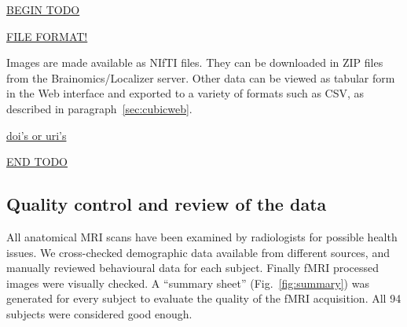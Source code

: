 \documentclass[review]{elsarticle}
\begin{document}
\underline{BEGIN TODO}

\underline{FILE FORMAT!}

Images are made available as NIfTI files. They can be downloaded in ZIP files from the Brainomics/Localizer server. Other data can be viewed as tabular form in the Web interface and exported to a variety of formats such as CSV, as described in paragraph~\ref{sec:cubicweb}.

\underline{doi's or uri's}

\underline{END TODO}


\subsection{Quality control and review of the data}

All anatomical MRI scans have been examined by radiologists for possible health issues. We cross-checked demographic data available from different sources, and manually reviewed behavioural data for each subject. Finally fMRI processed images were visually checked. A ``summary sheet'' (Fig.~\ref{fig:summary}) was generated for every subject to evaluate the quality of the fMRI acquisition. All 94 subjects were considered good enough.
\end{document}
